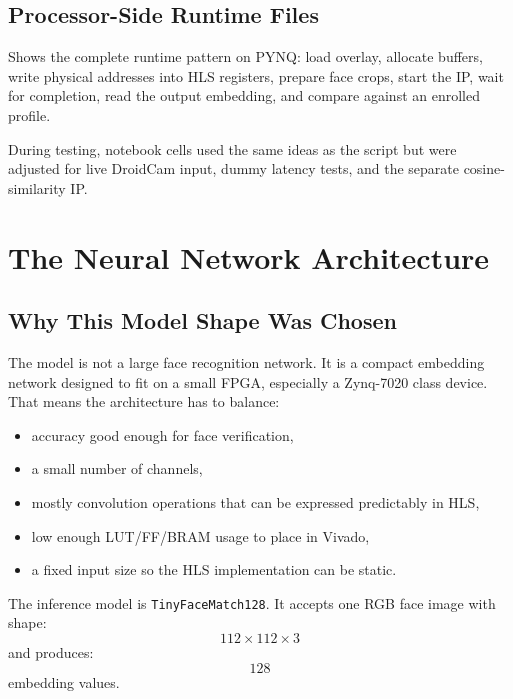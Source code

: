 \documentclass[11pt]{article}
\newcommand{\code}[1]{\texttt{#1}}
\begin{document}
\subsection{Processor-Side Runtime Files}

\begin{description}[leftmargin=2.7em,style=nextline]
  \item[\code{scripts/pynq\_hls\_camera\_verify.py}]
  Shows the complete runtime pattern on PYNQ:
  load overlay, allocate buffers, write physical addresses into HLS registers, prepare face crops, start the IP, wait for completion, read the output embedding, and compare against an enrolled profile.

  \item[Notebook cells]
  During testing, notebook cells used the same ideas as the script but were adjusted for live DroidCam input, dummy latency tests, and the separate cosine-similarity IP.
\end{description}

\section{The Neural Network Architecture}

\subsection{Why This Model Shape Was Chosen}

The model is not a large face recognition network.
It is a compact embedding network designed to fit on a small FPGA, especially a Zynq-7020 class device.
That means the architecture has to balance:

\begin{itemize}[leftmargin=1.4em]
  \item accuracy good enough for face verification,
  \item a small number of channels,
  \item mostly convolution operations that can be expressed predictably in HLS,
  \item low enough LUT/FF/BRAM usage to place in Vivado,
  \item a fixed input size so the HLS implementation can be static.
\end{itemize}

The inference model is \code{TinyFaceMatch128}.
It accepts one RGB face image with shape:
\[
  112 \times 112 \times 3
\]
and produces:
\[
  128
\]
embedding values.
\end{document}
